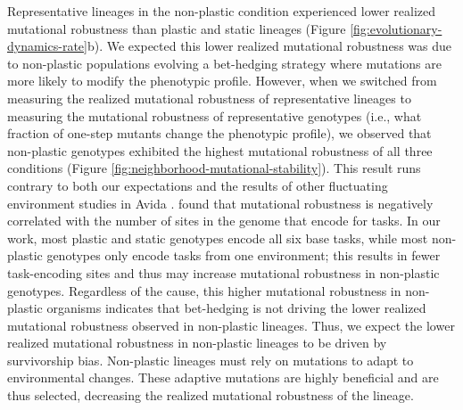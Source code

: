 Representative lineages in the non-plastic condition experienced lower realized mutational robustness than plastic and static lineages (Figure \ref{fig:evolutionary-dynamics-rate}b).
We expected this lower realized mutational robustness was due to non-plastic populations evolving a bet-hedging strategy where mutations are more likely to modify the phenotypic profile. 
However, when we switched from measuring the realized mutational robustness of representative lineages to measuring the mutational robustness of representative genotypes (i.e., what fraction of one-step mutants change the phenotypic profile), we observed that non-plastic genotypes exhibited the highest mutational robustness of all three conditions (Figure \ref{fig:neighborhood-mutational-stability}).
This result runs contrary to both our expectations and the results of other fluctuating environment studies in Avida \citep{canino-koning_fluctuating_2019}.
\cite{canino-koning_fluctuating_2019} found that mutational robustness is negatively correlated with the number of sites in the genome that encode for tasks.
In our work, most plastic and static genotypes encode all six base tasks, while most non-plastic genotypes only encode tasks from one environment; this results in fewer task-encoding sites and thus may increase mutational robustness in non-plastic genotypes. %
Regardless of the cause, this higher mutational robustness in non-plastic organisms indicates that bet-hedging is not driving the  lower realized mutational robustness observed in non-plastic lineages.
Thus, we expect the lower realized mutational robustness in non-plastic lineages to be driven by survivorship bias. 
Non-plastic lineages must rely on mutations to adapt to environmental changes. 
These adaptive mutations are highly beneficial and are thus selected, decreasing the realized mutational robustness of the lineage. 


